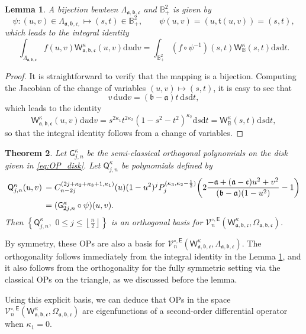 \documentclass{amsart}
\newtheorem{thm}{Theorem}[section]
\newtheorem{lem}[thm]{Lemma}
\theoremstyle{remark}
\def\d{\mathrm{d}}
\def\sE{{\mathsf E}}
\def\sG{{\mathsf G}}
\def\sQ{{\mathsf Q}}
\def\sW{{\mathsf W}}
\def\fa{{\mathfrak a}}
\def\fb{{\mathfrak b}}
\def\fc{{\mathfrak c}}
\def\ft{{\mathfrak t}}
\def\k{{\kappa}}
\def\CV{{\mathcal V}}
\def\BB{{\mathbb B}}
\def\f{\frac}
\begin{document}
\begin{lem} \label{lem:st-uv}
A bijection bewteen $\Lambda_{\fa,\fb,\fc}$ and $\BB_+^2$ is given by 
\begin{equation}\label{st-uv}
\psi: (u,v) \in  \Lambda_{\fa,\fb,\fc,} \mapsto (s,t) \in \BB_+^2, \qquad \psi (u,v) = (u, \ft (u,v)) = (s,t),
\end{equation}
which leads to the integral identity 
$$
   \int_{\Lambda_{\fa,\fb,\fc}} f(u,v) \sW_{\fa,\fb,\fc}^\k (u,v) \d u \d v = 
       \int_{\BB_+^2} (f\circ\psi^{-1})(s,t) \sW_\BB^\k(s,t) \d s \d t. 
$$
\end{lem}

\begin{proof}
It is straightforward to verify that the mapping is a bijection. Computing the Jacobian of the change of variables 
$(u,v) \mapsto (s,t)$, it is easy to see that
$$
v\, \d u \d v = (\fb - \fa)t\, \d s \d t, 
$$
which leads to the identity 
$$
      \sW_{\fa,\fb,\fc}^{\k} (u,v) \d u \d v = s^{2\k_1} t^{2\k_2} (1-s^2-t^2)^{\k_2} \d s \d t= \sW_\BB^\k (s,t) \d s \d t,
$$
so that the integral identity follows from a change of variables. 
\end{proof}

\begin{thm}\label{prop:sQjn}
Let $\sG_{j,n}^\k$ be the semi-classical orthogonal polynomials on the disk given in \eqref{eq:OP_disk}. 
Let $\sQ_{j,n}^\k$ be polynomials defined by 
\begin{align} \label{sQ-sG}
   \sQ_{j,n}^\k(u,v)\, &  = C_{n-2j}^{(2j + \k_2+\k_3 +1,\k_1)}(u) (1-u^2)^{j} 
   P_j^{(\k_3, \k_2-\f12)}\bigg(2 \frac{-\fa+(\fa-\fc)u^2+v^2}{(\fb-\fa)(1-u^2)} -1\bigg) \notag  \\
   \,& = (\sG_{2j,n}^\k \circ \psi) (u,v).
\end{align}
Then $\left\{ \sQ_{j, n}^\k, \,\, 0  \le j \le \left\lfloor  \f{n}{2} \right\rfloor \right\}$ is an 
orthogonal basis for $\CV_n^{\circ, \sE}(\sW_{\fa,\fb,\fc}^\k, \Omega_{\fa,\fb,\fc})$.
\end{thm}

By symmetry, these OPs are also a basis for $\CV_n^{\circ, \sE}(\sW_{\fa,\fb,\fc}^\k, \Lambda_{\fa,\fb,\fc})$. 
The orthogonality follows immediately from the integral identity in the Lemma \ref{lem:st-uv}, and it also follows
from the orthogonality for the fully symmetric setting via the classical OPs on the triangle, as we discussed 
before the lemma. 

Using this explicit basis, we can deduce that OPs in the space $\CV_n^{\circ, \sE}(\sW_{\fa,\fb,\fc}^\k, \Omega_{\fa,\fb,\fc})$
are eigenfunctions of a second-order differential operator when $\k_1 =0$. 
\end{document}

